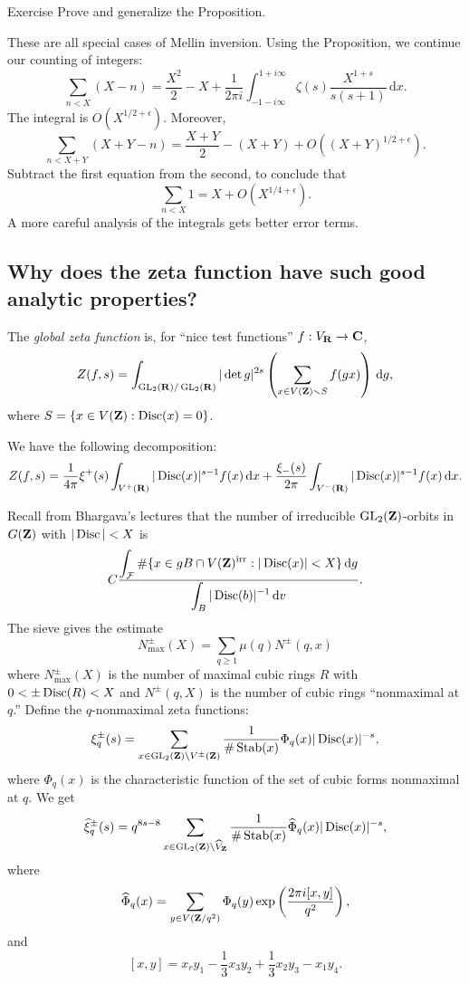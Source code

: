 \begin{enonce}{Exercise}
Prove and generalize the Proposition. 
\end{enonce}

These are all special cases of Mellin inversion. Using the Proposition, we 
continue our counting of integers: 
\[
  \sum_{n<X} (X-n) = \frac{X^2}{2} - X + \frac{1}{2\pi i} \int_{-1-i\infty}^{1+i\infty} \zeta(s) \frac{X^{1+s}}{s(s+1)}\, \mathrm{d} x .
\]
The integral is $O(X^{1/2+\epsilon})$. Moreover, 
\[
  \sum_{n<X+Y} (X+Y-n) = \frac{X+Y}{2} - (X+Y) + O((X+Y)^{1/2+\epsilon}) .
\]
Subtract the first equation from the second, to conclude that 
\[
  \sum_{n<X} 1 = X+O(X^{1/4+\epsilon}) .
\]
A more careful analysis of the integrals gets better error terms. 





\subsection{Why does the zeta function have such good analytic properties?}

\begin{defi}[Shintani]
The \emph{global zeta function} is, for ``nice test functions'' 
$f:V_{\mathbf{R}}\to \mathbf{C}$, 
\[
  Z(f,s) = \int_{\operatorname{GL}_2(\mathbf{R})/\operatorname{GL}_2(\mathbf{R})} |\det g|^{2 s} \left(\sum_{x\in V(\mathbf{Z})\smallsetminus S} f(g x)\right)\, \mathrm{d} g ,
\]
where $S=\{x\in V(\mathbf{Z}):\operatorname{Disc}(x)=0\}$. 
\end{defi}

\begin{prop}
We have the following decomposition:
\[
  Z(f,s) = \frac{1}{4\pi} \xi^+(s) \int_{V^+(\mathbf{R})} |\operatorname{Disc}(x)|^{s-1} f(x)\, \mathrm{d}x + \frac{\xi_-(s)}{2\pi} \int_{V^-(\mathbf{R})} |\operatorname{Disc}(x)|^{s-1} f(x)\,\mathrm{d} x .
\]
\end{prop}

Recall from Bhargava's lectures that the number of irreducible 
$\operatorname{GL}_2(\mathbf{Z})$-orbits in $G(\mathbf{Z})$ with $|\operatorname{Disc}|<X$ is 
\[
  C \frac{\displaystyle\int_{\mathcal{F}}\#\{x\in g B\cap V(\mathbf{Z})^\mathrm{irr}:|\operatorname{Disc}(x)|<X\}\,\mathrm{d}g}{\displaystyle\int_B |\operatorname{Disc}(b)|^{-1}\, \mathrm{d} v} .
\]
The sieve gives the estimate 
\[
  N_\mathrm{max}^\pm(X) = \sum_{q\geqslant 1} \mu(q) N^\pm(q,x) 
\]
where $N^\pm_\mathrm{max}(X)$ is the number of maximal cubic rings $R$ with 
$0<\pm \operatorname{Disc}(R)<X$ and 
$N^\pm(q,X)$ is the number of cubic rings ``nonmaximal at $q$.'' Define the 
$q$-nonmaximal zeta functions: 
\[
  \xi_q^\pm(s) = \sum_{x\in \operatorname{GL}_2(\mathbf{Z})\backslash V^\pm(\mathbf{Z})} \frac{1}{\#\operatorname{Stab}(x)} \Phi_q(x) |\operatorname{Disc}(x)|^{-s} ,
\]
where $\Phi_q(x)$ is the characteristic function of the set of cubic forms 
nonmaximal at $q$. We get 
\[
  \widehat\xi_q^\pm(s) = q^{8 s-8} \sum_{x\in \operatorname{GL}_2(\mathbf{Z})\backslash \widehat V_{\mathbf{Z}}} \frac{1}{\#\operatorname{Stab}(x)}\widehat\Phi_q(x) |\operatorname{Disc}(x)|^{-s} ,
\]
where 
\[
  \widehat\Phi_q(x) = \sum_{y\in V(\mathbf{Z}/q^2)} \Phi_q(y) \exp\left(\frac{2\pi i[x,y]}{q^2}\right) ,
\]
and 
\[
  [x,y] = x_r y_1 - \frac 1 3 x_3 y_2 + \frac 1 3 x_2 y_3 - x_1 y_4 .
\]




